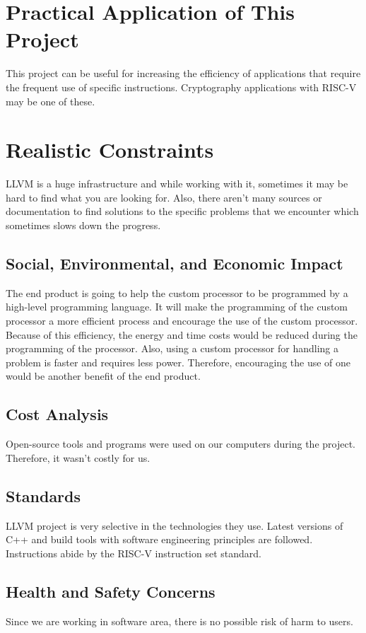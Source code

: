 \section{Practical Application of This Project}
This project can be useful for increasing the efficiency of applications that require the frequent use of specific instructions. Cryptography applications with RISC-V may be one of these.

\section{Realistic Constraints}
LLVM is a huge infrastructure and while working with it, sometimes it may be hard to find what you are looking for. Also, there aren’t many sources or documentation to find solutions to the specific problems that we encounter which sometimes slows down the progress.

\subsection{Social, Environmental, and Economic Impact}
The end product is going to help the custom processor to be programmed by a high-level programming language. It will make the programming of the custom processor a more efficient process and encourage the use of the custom processor. Because of this efficiency, the energy and time costs would be reduced during the programming of the processor. Also, using a custom processor for handling a problem is faster and requires less power. Therefore, encouraging the use of one would be another benefit of the end product.

\subsection{Cost Analysis}
Open-source tools and programs were used on our computers during the project. Therefore, it wasn’t costly for us.

\pagebreak
\subsection{Standards}
LLVM project is very selective in the technologies they use. Latest versions of C++ and build tools with software engineering principles are followed. Instructions abide by the RISC-V instruction set standard.

\subsection{Health and Safety Concerns}
Since we are working in software area, there is no possible risk of harm to users.

